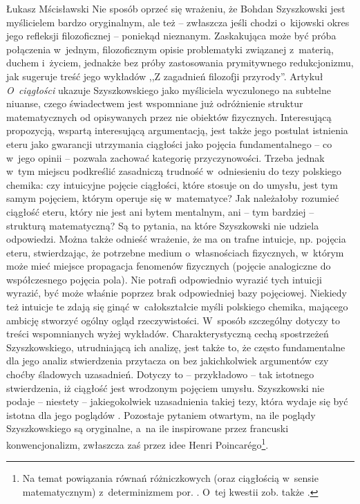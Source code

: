 \begin{artplenv}{Łukasz Mścisławski}
Nie sposób oprzeć się wrażeniu, że Bohdan Szyszkowski jest myślicielem bardzo oryginalnym, ale też -- zwłaszcza jeśli chodzi o~kijowski okres jego refleksji filozoficznej -- poniekąd nieznanym. Zaskakująca może być próba połączenia w~jednym, filozoficznym opisie problematyki związanej z~materią, duchem i~życiem, jednakże bez próby zastosowania prymitywnego redukcjonizmu, jak sugeruje treść jego wykładów ,,Z zagadnień filozofji przyrody''. Artykuł \textit{O~ciągłości} ukazuje Szyszkowskiego jako myśliciela wyczulonego na subtelne niuanse, czego świadectwem jest wspomniane już odróżnienie struktur matematycznych od opisywanych przez nie obiektów fizycznych. Interesującą propozycją, wspartą interesującą argumentacją, jest także jego postulat istnienia eteru jako gwarancji utrzymania ciągłości jako pojęcia fundamentalnego -- co w~jego opinii -- pozwala zachować kategorię przyczynowości. Trzeba jednak w~tym miejscu podkreślić zasadniczą trudność w~odniesieniu do tezy polskiego chemika: czy intuicyjne pojęcie ciągłości, które stosuje on do umysłu, jest tym samym pojęciem, którym operuje się w~matematyce? Jak należałoby rozumieć ciągłość eteru, który nie jest ani bytem mentalnym, ani -- tym bardziej -- strukturą matematyczną? Są to pytania, na które Szyszkowski nie udziela odpowiedzi. Można także odnieść wrażenie, że ma on trafne intuicje, np. pojęcia eteru, stwierdzając, że potrzebne medium o~własnościach fizycznych, w~którym może mieć miejsce propagacja fenomenów fizycznych (pojęcie analogiczne do współczesnego pojęcia pola). Nie potrafi odpowiednio wyrazić tych intuicji wyrazić, być może właśnie poprzez brak odpowiedniej bazy pojęciowej. Niekiedy też intuicje te zdają się ginąć w~całokształcie myśli polskiego chemika, mającego ambicję stworzyć ogólny ogląd rzeczywistości. W~sposób szczególny dotyczy to treści wspomnianych wyżej wykładów. Charakterystyczną cechą spostrzeżeń Szyszkowskiego, utrudniającą ich analizę, jest także to, że często fundamentalne dla jego analiz stwierdzenia przytacza on bez jakichkolwiek argumentów czy choćby śladowych uzasadnień. Dotyczy to -- przykładowo -- tak istotnego stwierdzenia, iż ciągłość jest wrodzonym pojęciem umysłu. Szyszkowski nie podaje -- niestety -- jakiegokolwiek uzasadnienia takiej tezy, która wydaje się być istotna dla jego poglądów
\parencite[por.][s.~47]{szyszkowski_o_1916}. %
Pozostaje pytaniem otwartym, na ile poglądy Szyszkowskiego są oryginalne, a~na ile inspirowane przez francuski konwencjonalizm, zwłaszcza zaś przez idee Henri
Poincarégo\footnote{Na temat powiązania równań różniczkowych (oraz ciągłością w~sensie matematycznym) z~determinizmem por. 
\parencites[][s.~98–135]{poincare_nauka_1908}[][s.~98–135, 160–169]{poincare_wartosc_1908}. O~tej kwestii zob. także 
\parencite[][s.~80–81]{leszczynski_wprowadzenie_2003}.}.


\end{artplenv}
